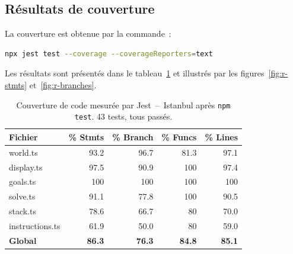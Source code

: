 \documentclass[12pt,a4paper]{article}
\begin{document}
\subsection{Résultats de couverture}
\label{subsec:r-coverage}
 
La couverture est obtenue par la commande~:
 
\begin{lstlisting}[language=bash, numbers=none]
npx jest test --coverage --coverageReporters=text
\end{lstlisting}
 
Les résultats sont présentés dans le tableau~\ref{tab:r-coverage} et
illustrés par les figures~\ref{fig:r-stmts} et~\ref{fig:r-branches}.
 
\begin{table}[h!]
\centering
\renewcommand{\arraystretch}{1.4}
\begin{tabular}{>{\ttfamily}l r r r r}
\toprule
\normalfont Fichier & \% Stmts & \% Branch & \% Funcs & \% Lines \\
\midrule
world.ts        & \cellcolor{okgreen!30}93.2 & \cellcolor{okgreen!30}96.7 & \cellcolor{okgreen!30}81.3 & \cellcolor{okgreen!30}97.1 \\
display.ts      & \cellcolor{okgreen!30}97.5 & \cellcolor{okgreen!30}90.9 & \cellcolor{okgreen!30}100  & \cellcolor{okgreen!30}97.4 \\
goals.ts        & \cellcolor{okgreen!30}100  & \cellcolor{okgreen!30}100  & \cellcolor{okgreen!30}100  & \cellcolor{okgreen!30}100  \\
solve.ts        & \cellcolor{okgreen!30}91.1 & \cellcolor{warncolor!30}77.8& \cellcolor{okgreen!30}100  & \cellcolor{okgreen!30}90.5 \\
stack.ts        & \cellcolor{warncolor!30}78.6& \cellcolor{warncolor!30}66.7& \cellcolor{warncolor!30}80  & \cellcolor{warncolor!30}70.0 \\
instructions.ts & \cellcolor{warncolor!30}61.9& \cellcolor{warncolor!30}50.0& \cellcolor{warncolor!30}80  & \cellcolor{warncolor!30}59.0 \\
\midrule
\textbf{Global} & \textbf{86.3} & \textbf{76.3} & \textbf{84.8} & \textbf{85.1} \\
\bottomrule
\end{tabular}
\caption{Couverture de code mesurée par Jest~--~Istanbul après \texttt{npm test}.
  43 tests, tous passés.}
\label{tab:r-coverage}
\end{table}
 
\end{document}
